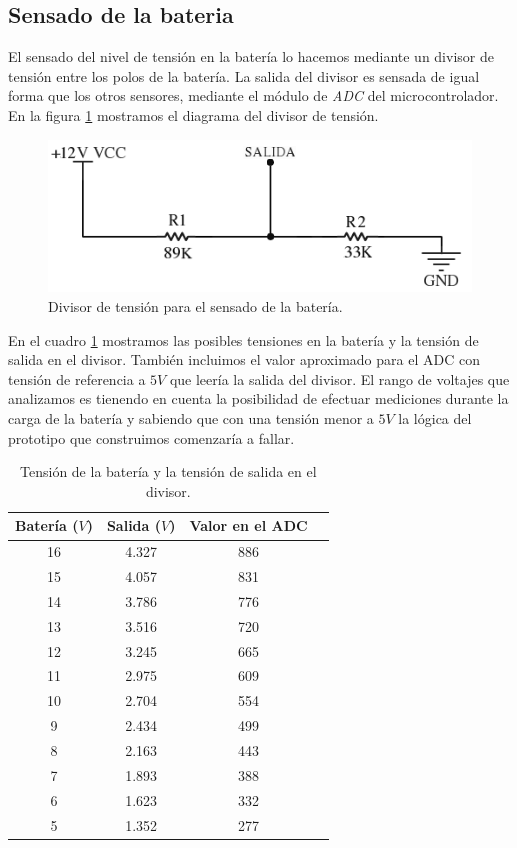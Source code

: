 \subsection{Sensado de la bateria}
\label{h_sensado_bateria}

El sensado del nivel de tensi\'on en la bater\'ia lo hacemos mediante un divisor de tensi\'on entre los polos de la bater\'ia.
La salida del divisor es sensada de igual forma que los otros sensores, mediante el m\'odulo de \emph{ADC} del microcontrolador.
En la figura \ref{hF_bateria_diagrama} mostramos el diagrama del divisor de tensi\'on.

\begin{figure}[ht]
	\centering
	\includegraphics[scale=0.35]{figuras/bateria.png}
	\caption{Divisor de tensi\'on para el sensado de la bater\'ia.}
	\label{hF_bateria_diagrama}
\end{figure}

En el cuadro \ref{hT_bateria_divT} mostramos las posibles tensiones en la bater\'ia y la tensi\'on de salida en el divisor.
Tambi\'en incluimos el valor aproximado para el ADC con tensi\'on de referencia a $5V$ que leer\'ia la salida del divisor.
El rango de voltajes que analizamos es tienendo en cuenta la posibilidad de efectuar mediciones durante la carga de la bater\'ia
y sabiendo que con una tensi\'on menor a $5 V$ la l\'ogica del prototipo que construimos comenzar\'ia a fallar.

\begin{table}[ht]
	\begin{center}
		\begin{tabular}{|c|c|c|c|}
			\hline
			Bater\'ia ($V$) & Salida ($V$) & Valor en el ADC \\
			\hline
			16 & 4.327 & 886 \\
			15 & 4.057 & 831 \\
			14 & 3.786 & 776 \\
			13 & 3.516 & 720 \\
			12 & 3.245 & 665 \\
			11 & 2.975 & 609 \\
			10 & 2.704 & 554 \\
			 9 & 2.434 & 499 \\
			 8 & 2.163 & 443 \\
			 7 & 1.893 & 388 \\
			 6 & 1.623 & 332 \\
			 5 & 1.352 & 277 \\
			\hline
		\end{tabular}
	\end{center}
	\caption{Tensi\'on de la bater\'ia y la tensi\'on de salida en el divisor.}
	\label{hT_bateria_divT}
\end{table}

